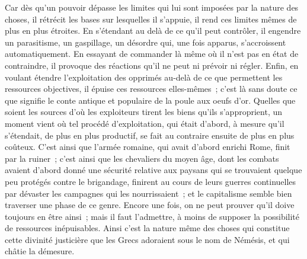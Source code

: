 \documentclass[french,twoside]{book} %
\begin{document}
Car dès qu'un pouvoir dépasse les limites qui lui sont imposées par la nature des choses, il rétrécit les bases sur lesquelles il s'appuie, il rend ces limites mêmes de plus en plus étroites. En s'étendant au delà de ce qu'il peut contrôler, il engendre un parasitisme, un gaspillage, un désordre qui, une fois apparus, s'accroissent automatiquement. En essayant de commander là même où il n'est pas en état de contraindre, il provoque des réactions qu'il ne peut ni prévoir ni régler. Enfin, en voulant étendre l'exploitation des opprimés au-delà de ce que permettent les ressources objectives, il épuise ces ressources elles-mêmes ; c'est là sans doute ce que signifie le conte antique et populaire de la poule aux oeufs d'or. Quelles que soient les sources d'où les exploiteurs tirent les biens qu'ils s'approprient, un moment vient où tel procédé d'exploitation, qui était d'abord, à mesure qu'il s'étendait, de plus en plus productif, se fait au contraire ensuite de plus en plus coûteux. C'est ainsi que l'armée romaine, qui avait d'abord enrichi Rome, finit par la ruiner ; c'est ainsi que les chevaliers du moyen âge, dont les combats avaient d'abord donné une sécurité relative aux paysans qui se trouvaient quelque peu protégés contre le brigandage, finirent au cours de leurs guerres continuelles par dévaster les campagnes qui les nourrissaient ; et le capitalisme semble bien traverser une phase de ce genre. Encore une fois, on ne peut prouver qu'il doive toujours en être ainsi ; mais il faut l'admettre, à moins de supposer la possibilité de ressources inépuisables. Ainsi c'est la nature même des choses qui constitue cette divinité justicière que les Grecs adoraient sous le nom de Némésis, et qui châtie la démesure.\par
\end{document}
